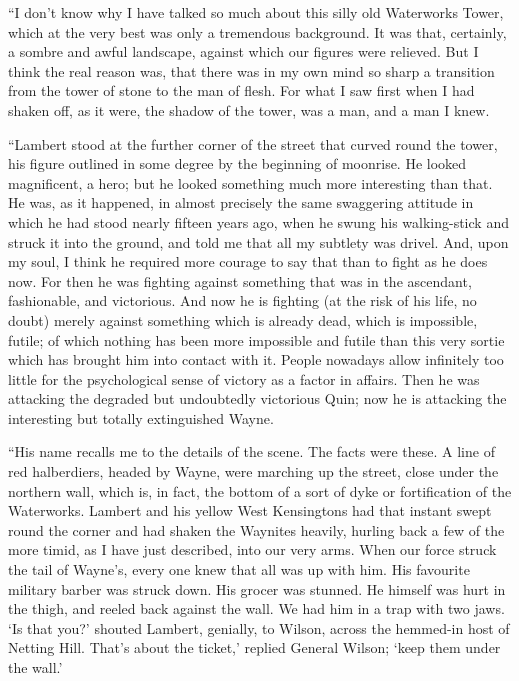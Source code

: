 \documentclass{book}
\begin{document}
“I don’t know why I have talked so much about this silly old Waterworks Tower, which at the very best was only a tremendous background. It was that, certainly, a sombre and awful landscape, against which our figures were relieved. But I think the real reason was, that there was in my own mind so sharp a transition from the tower of stone to the man of flesh. For what I saw first when I had shaken off, as it were, the shadow of the tower, was a man, and a man I knew.

“Lambert stood at the further corner of the street that curved round the tower, his figure outlined in some degree by the beginning of moonrise. He looked magnificent, a hero; but he looked something much more interesting than that. He was, as it happened, in almost precisely the same swaggering attitude in which he had stood nearly fifteen years ago, when he swung his walking-stick and struck it into the ground, and told me that all my subtlety was drivel. And, upon my soul, I think he required more courage to say that than to fight as he does now. For then he was fighting against something that was in the ascendant, fashionable, and victorious. And now he is fighting (at the risk of his life, no doubt) merely against something which is already dead, which is impossible, futile; of which nothing has been more impossible and futile than this very sortie which has brought him into contact with it. People nowadays allow infinitely too little for the psychological sense of victory as a factor in affairs. Then he was attacking the degraded but undoubtedly victorious Quin; now he is attacking the interesting but totally extinguished Wayne.

“His name recalls me to the details of the scene. The facts were these. A line of red halberdiers, headed by Wayne, were marching up the street, close under the northern wall, which is, in fact, the bottom of a sort of dyke or fortification of the Waterworks. Lambert and his yellow West Kensingtons had that instant swept round the corner and had shaken the Waynites heavily, hurling back a few of the more timid, as I have just described, into our very arms. When our force struck the tail of Wayne’s, every one knew that all was up with him. His favourite military barber was struck down. His grocer was stunned. He himself was hurt in the thigh, and reeled back against the wall. We had him in a trap with two jaws. ‘Is that you?’ shouted Lambert, genially, to Wilson, across the hemmed-in host of Netting Hill. That’s about the ticket,’ replied General Wilson; ‘keep them under the wall.’
\end{document}
